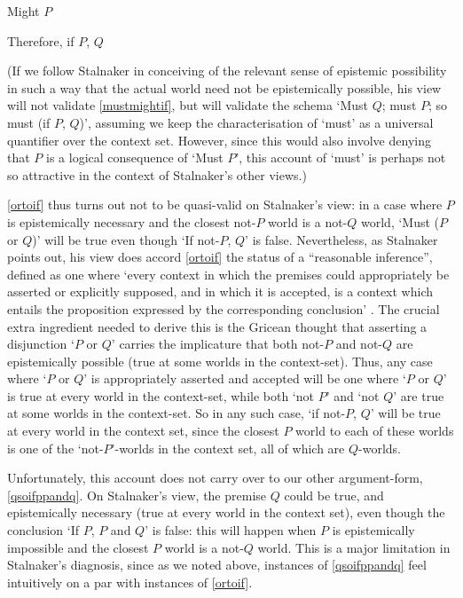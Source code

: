 \documentclass[If.tex]{subfiles}
\begin{document}
\begin{prop}
\begin{prop}
	Might $P$
	
	Therefore, if $P$, $Q$
\end{prop}
(If we follow Stalnaker in conceiving of the relevant sense of epistemic possibility in such a way that the actual world need not be epistemically possible, his view will not validate \ref{mustmightif}, but will validate the schema ‘Must $Q$; must $P$; so must (if $P$, $Q$)’, assuming we keep the characterisation of ‘must’ as a universal quantifier over the context set.  However, since this would also involve denying that $P$ is a logical consequence of ‘Must $P$’, this account of ‘must’ is perhaps not so attractive in the context of Stalnaker's other views.)

\ref{ortoif} thus turns out not to be quasi-valid on Stalnaker's view: in a case where $P$ is epistemically necessary and the closest not-$P$ world is a not-$Q$ world, ‘Must ($P$ or $Q$)’ will be true even though ‘If not-$P$, $Q$’ is false.  Nevertheless, as Stalnaker points out, his view does accord \ref{ortoif} the status of a “reasonable inference”, defined as one where ‘every context in which the premises could appropriately be asserted or explicitly supposed, and in which it is accepted, is a context which entails the proposition expressed by the corresponding conclusion’ \parencite{StalnakerIC}.  The crucial extra ingredient needed to derive this is the Gricean thought that asserting a disjunction ‘$P$ or $Q$’ carries the implicature that both not-$P$ and not-$Q$ are epistemically possible (true at some worlds in the context-set).  Thus, any case where ‘$P$ or $Q$’ is appropriately asserted and accepted will be one where ‘$P$ or $Q$’ is true at every world in the context-set, while both ‘not $P$’ and ‘not $Q$’ are true at some worlds in the context-set.  So in any such case, ‘if not-$P$, $Q$’ will be true at every world in the context set, since the closest $P$ world to each of these worlds is one of the ‘not-$P$’-worlds in the context set, all of which are $Q$-worlds.  

Unfortunately, this account does not carry over to our other argument-form, \ref{qsoifppandq}.  On Stalnaker's view, the premise $Q$ could be true, and epistemically necessary (true at every world in the context set), even though the conclusion ‘If $P$, $P$ and $Q$’ is false: this will happen when $P$ is epistemically impossible and the closest $P$ world is a not-$Q$ world.  This is a major limitation in Stalnaker's diagnosis, since as we noted above, instances of \ref{qsoifppandq} feel intuitively on a par with instances of \ref{ortoif}.  


\end{prop}
\end{document}
